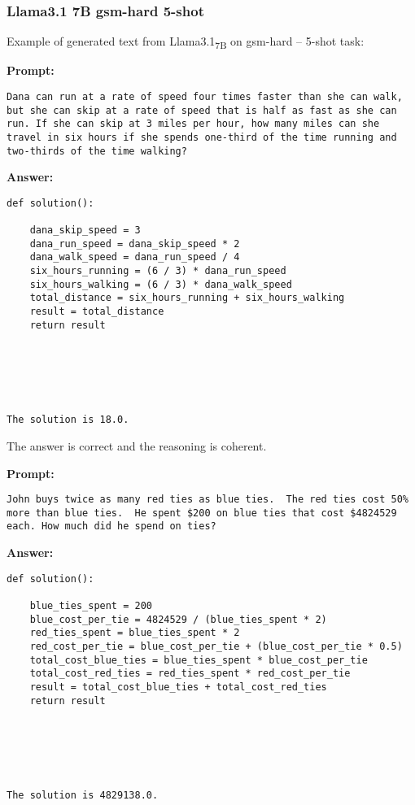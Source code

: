 	\subsubsection*{Llama3.1 7B gsm-hard 5-shot}
	\noindent Example of generated text from Llama3.1\textsubscript{7B} on gsm-hard -- 5-shot task:
	\begin{displayquote}
		\textbf{Prompt:}
		\begin{Verbatim}[fontsize=\small,breaklines]
Dana can run at a rate of speed four times faster than she can walk, but she can skip at a rate of speed that is half as fast as she can run. If she can skip at 3 miles per hour, how many miles can she travel in six hours if she spends one-third of the time running and two-thirds of the time walking?
	\end{Verbatim}
		\textbf{Answer:}
		\begin{Verbatim}[fontsize=\small,breaklines]
def solution():

    dana_skip_speed = 3
    dana_run_speed = dana_skip_speed * 2
    dana_walk_speed = dana_run_speed / 4
    six_hours_running = (6 / 3) * dana_run_speed
    six_hours_walking = (6 / 3) * dana_walk_speed
    total_distance = six_hours_running + six_hours_walking
    result = total_distance
    return result






The solution is 18.0.
	\end{Verbatim}
	\end{displayquote}
	The answer is correct and the reasoning is coherent.
	\begin{displayquote}
		\textbf{Prompt:}
		\begin{Verbatim}[fontsize=\small,breaklines]
John buys twice as many red ties as blue ties.  The red ties cost 50% more than blue ties.  He spent $200 on blue ties that cost $4824529 each. How much did he spend on ties?
	\end{Verbatim}
		\textbf{Answer:}
		\begin{Verbatim}[fontsize=\small,breaklines]
def solution():

    blue_ties_spent = 200
    blue_cost_per_tie = 4824529 / (blue_ties_spent * 2)
    red_ties_spent = blue_ties_spent * 2
    red_cost_per_tie = blue_cost_per_tie + (blue_cost_per_tie * 0.5)
    total_cost_blue_ties = blue_ties_spent * blue_cost_per_tie
    total_cost_red_ties = red_ties_spent * red_cost_per_tie
    result = total_cost_blue_ties + total_cost_red_ties
    return result






The solution is 4829138.0.
	\end{Verbatim}
	\end{displayquote}
